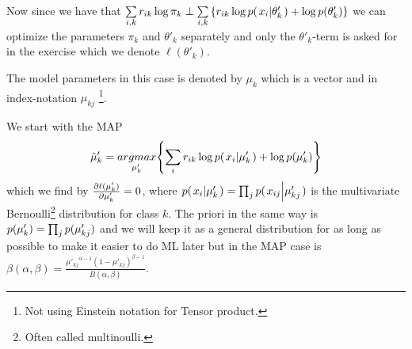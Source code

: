 \documentclass[a4paper,twoside=false,abstract=false,numbers=noenddot,
titlepage=false,headings=small,parskip=half,version=last]{scrartcl}
\begin{document}
\begin{solution}
    Now since we have that $\sum\limits_{i,k}r_{ik}\log\pi_k \perp
    \sum\limits_{i,k}\left\{r_{ik}\log p{(\left. x_i \middle\vert \theta'_k \right.)}+\log
    p{(\theta'_k)}\right\}$ we can optimize the parameters
    $\pi_k$ and $\theta'_k$ separately and only the $\theta'_k$-term is asked for in the
    exercise which we denote $\ell(\theta'_k)$.

    The model parameters in this case is denoted by $\mu_k$ which is a vector
    and in index-notation $\mu_{kj}$
    \footnote{Not using Einstein notation for Tensor product.}.

    We start with the MAP
    \begin{equation}
        \hat{\mu}'_k = \underset{\mu'_k}{argmax}{\left\{\sum\limits_i
        r_{ik}\log p{(\left. x_i \middle\vert \mu'_k \right.)}+\log p{(\mu'_k)}\right\}}
    \end{equation}
    which we find by $\frac{\partial{\ell(\mu'_k)}}{\partial{\mu'_k}}=0$, where 
    $p{(\left. x_i \middle\vert \mu'_k \right.)}=\prod_j p{(\left. x_{ij} \middle\vert \mu'_{kj} \right.)}$ 
    is the multivariate Bernoulli\footnote{Often called multinoulli.}
    distribution for class $k$. The priori in the same way is
    $p{(\mu'_k)}=\prod_j{p{(\mu'_{kj})}}$ and we will keep it as a general
    distribution for as long as possible to make it easier to do ML later but
    in the MAP case is $\beta(\alpha,\beta)
    =\frac{{\mu'_{kj}}^{\alpha-1}(1-\mu'_{kj})^{\beta-1}}{B(\alpha,\beta)}$.


\end{solution}
\end{document}
